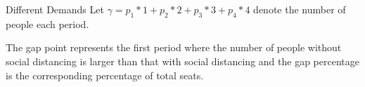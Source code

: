     \begin{frame}{Different Demands}
        \small
        Let $\gamma = p_1 * 1 + p_2 * 2 + p_3 * 3 + p_4 * 4$ denote the number of people each period.
        \begin{figure}[h]
            \centering
          \end{figure}

        The gap point represents the first period where the number of people without social distancing is larger than that with social distancing and the gap percentage is the corresponding percentage of total seats.
    \end{frame}
      
